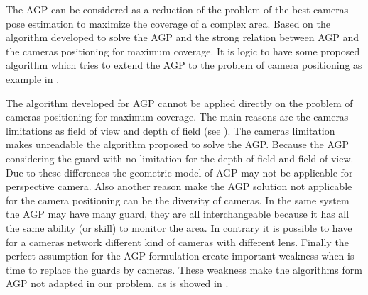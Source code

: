 The AGP can be considered as a reduction of the problem of the best cameras pose estimation to maximize the coverage of a complex area. Based on the algorithm developed to solve the AGP and the strong relation between AGP and the cameras positioning for maximum coverage. It is logic to have some proposed algorithm which tries to extend the AGP to the  problem of camera positioning as example in \cite{221*fleishman2000,33*reddy2012,43*erdem2006}.


The algorithm developed for AGP cannot be applied directly on the problem of cameras positioning for maximum coverage. The main reasons are the cameras limitations as field of view and depth of field (see \cite{82*chrysostomou2012,170*yabuta2008}). The cameras limitation makes  unreadable the algorithm proposed to solve the AGP.
 Because the AGP considering the guard with no limitation for the depth of field and field of view. Due to these differences the geometric model of AGP may not be applicable for perspective camera.
Also another reason make the AGP solution not applicable for the camera positioning can be the diversity of cameras. In the same system the AGP may have many guard, they are all interchangeable because it has all the same ability (or skill) to monitor the area. In contrary it is possible to have for a cameras network different kind of cameras with different lens. 
Finally the  perfect assumption for the AGP formulation create important weakness when is time to replace the guards by cameras. These weakness make the algorithms form AGP not adapted in our problem, as is showed in \cite{81*nikolaidis2009,171*horster2006}.

